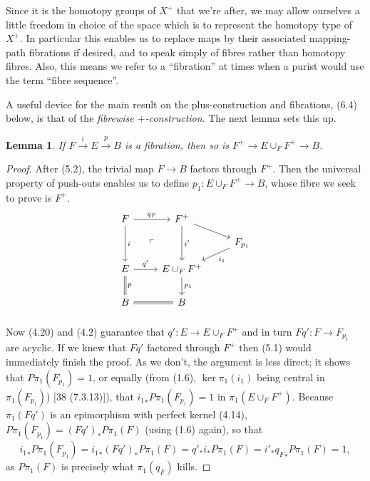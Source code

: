 \documentclass[openany,leqno]{book}  %
\newtheorem{lemma}[theorem]{Lemma}
\begin{document}
Since it is the homotopy groups of $X^+$ that we're after, we may allow ourselves a little freedom in choice of the space which is to represent the homotopy type of $X^+$. In particular this enables us to replace maps by their associated mapping-path fibrations if desired, and to speak simply of fibres rather than homotopy fibres. Also, this means we refer to a ``fibration'' at times when a purist would use the term ``fibre sequence''.

A useful device for the main result on the plus-construction and fibrations, (6.4) below, is that of the {\em fibrewise $+$-construction}. The next lemma sets this up.
\begin{lemma}
  If $F\overset{i}{\longrightarrow} E\overset{p}{\longrightarrow} B$ is a fibration, then so is $F^+\longrightarrow E\cup_F F^+ \longrightarrow B$.
\end{lemma}
\begin{proof}
 After (5.2), the trivial map $F \longrightarrow B$ factors through $F^+$. Then the universal property of push-outs enables us to define $p_1\colon   E\cup_F F^+ \rightarrow B$, whose fibre we seek to prove is $F^+$.
 \[
\begin{tikzcd}[row sep=small]
 F \arrow{r}{q_F} \arrow{dd}{i} \arrow[ddr, phantom, "\ulcorner"] & F^+ \arrow{dd}{i'} \arrow{rd} & \\
 & & F_{p_1} \arrow{dl}{i_1}\\
 E \arrow{r}{q'} \arrow[equal]{dd}{p} & E\cup_F F^+ \arrow{dd}{p_1} & \\
 &  & \\
 B \arrow[equal]{r} & B &\\
 \end{tikzcd}
 \]
Now (4.20) and (4.2) guarantee that $q'\colon   E \longrightarrow E\cup_F F^+$ and in turn $Fq'\colon   F\longrightarrow F_{p_1} $ are acyclic. If we knew that $Fq'$ factored through $F^+$ then (5.1) would immediately finish the proof. As we don't, the argument is less direct; it shows that $P\pi_1(F_{p_1}) = 1$, or equally (from (1.6), $\ker \pi_1(i_1)$ being central in $\pi_1(F_{p_1})$) [38 (7.3.13)]), that ${i_1}_*P\pi_1(F_{p_1}) = 1$ in $\pi_1(E\cup_F F^+)$. Because $\pi_1(Fq')$ is an epimorphism with perfect kernel (4.14), $P\pi_1(F_{p_1})=(Fq')_*P\pi_1(F)$ (using (1.6) again), so that
\[{i_1}_*P\pi_1(F_{p_1}) ={i_1}_*(Fq')_*P\pi_1(F)=q'_*i_*P\pi_1(F)=i'_*{q_{F}}_*P\pi_1(F)=1,\]
as $P\pi_1(F)$ is precisely what $\pi_1(q_F)$ kills.
 \end{proof}
  
\end{document}
